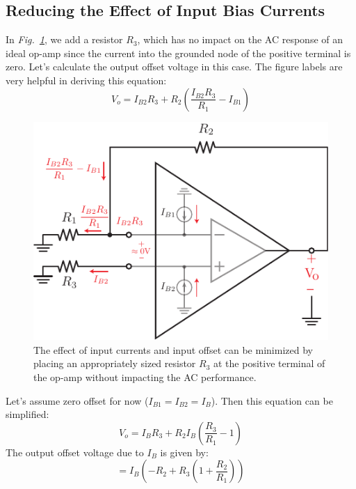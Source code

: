 \subsection{Reducing the Effect of Input Bias Currents}
In \emph{Fig.~\ref{fig:opamp_offset_reduce}}, we add a resistor $R_3$, which has no impact on the AC response of an ideal op-amp since the current into the grounded node of the positive terminal is zero.  Let's calculate the output offset voltage in this case.  The figure labels are very helpful in deriving this equation:
\begin{equation}
      V_o = I_{B2} R_3 + R_2 \left(  \frac{I_{B2}R_3}{R_1} - I_{B1}  \right)
\end{equation}
\begin{figure}[tb]
\centering
\includegraphics[scale=1]{opamp_offset_reduce}
\caption{The effect of input currents and input offset can be minimized by placing an appropriately sized resistor $R_3$ at the positive terminal of the op-amp without impacting the AC performance.} \label{fig:opamp_offset_reduce}
\end{figure}
\noindent Let's assume zero offset for now ($I_{B1} = I_{B2} = I_B$).  Then this equation can be simplified:
    \begin{equation}
        V_o = I_{B} R_3 + R_2 I_B \left( \frac{R_3}{R_1} - 1 \right)
    \end{equation}
The output offset voltage due to $I_B$ is given by:
    \begin{equation}
        = I_{B}  \left( -R_2 + R_3\left(1+ \frac{R_2}{R_1}  \right)  \right)
    \end{equation}
